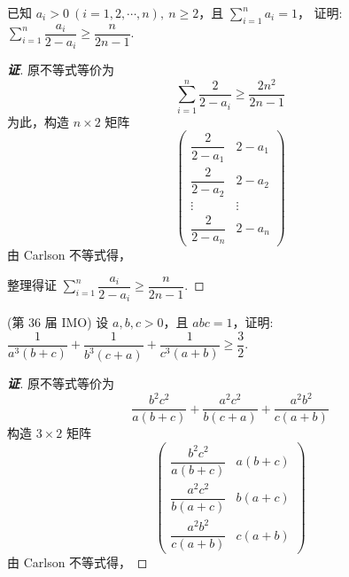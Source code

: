 \begin{example}
    已知 $a_i>0~ (i=1,2,\cdots,n),~n\geqslant 2$，且 $\displaystyle\sum_{i=1}^{n}a_i=1$，
    证明: $\displaystyle\sum_{i=1}^{n}\dfrac{a_i}{2-a_i}\geqslant \dfrac{n}{2n-1}.$
\end{example}
\begin{proof}[{\songti \textbf{证}}]
    原不等式等价为 $$\sum_{i=1}^{n}\dfrac{2}{2-a_i}\geqslant \dfrac{2n^2}{2n-1}$$
    为此，构造 $n\times 2$ 矩阵
    $$\begin{pmatrix}
            \dfrac{2}{2-a_1} & 2-a_1  \\[6pt]
            \dfrac{2}{2-a_2} & 2-a_2  \\[6pt]
            \vdots           & \vdots \\[6pt]
            \dfrac{2}{2-a_n} & 2-a_n
        \end{pmatrix}$$
    由 Carlson 不等式得，
    整理得证 $\displaystyle\sum_{i=1}^{n}\dfrac{a_i}{2-a_i}\geqslant \dfrac{n}{2n-1}.$
\end{proof}

\begin{example}
    (第 36 届 IMO) 设 $a,b,c>0$，且 $abc=1$，证明: $\dfrac{1}{a^3(b+c)}+\dfrac{1}{b^3(c+a)}+\dfrac{1}{c^3(a+b)}\geqslant\dfrac{3}{2}.$
\end{example}
\begin{proof}[{\songti \textbf{证}}]
    原不等式等价为 $$\dfrac{b^2c^2}{a(b+c)}+\dfrac{a^2c^2}{b(c+a)}+\dfrac{a^2b^2}{c(a+b)}$$
    构造 $3\times 2$ 矩阵
    $$\begin{pmatrix}
            \dfrac{b^2c^2}{a(b+c)} & a(b+c) \\[6pt]
            \dfrac{a^2c^2}{b(a+c)} & b(a+c) \\[6pt]
            \dfrac{a^2b^2}{c(a+b)} & c(a+b)
        \end{pmatrix}$$
    由 Carlson 不等式得，
\end{proof}